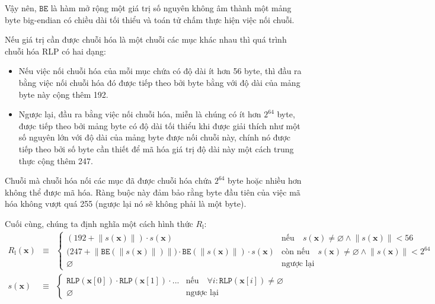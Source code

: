\documentclass[9pt,oneside]{amsart}
\makeatletter
\newcommand{\linkdest}[1]{\Hy@raisedlink{\hypertarget{#1}{}}}
\makeatother
\begin{document}
Vậy nên, $\mathtt{BE}$ là hàm mở rộng một giá trị số nguyên không âm thành một mảng byte big-endian có chiều dài tối thiểu và toán tử chấm thực hiện việc nối chuỗi.

\hypertarget{RLP_serialisation_of_a_sequence_of_other_items_R__l_word_def}{}\linkdest{R__l}Nếu giá trị cần được chuỗi hóa là một chuỗi các mục khác nhau thì quá trình chuỗi hóa RLP có hai dạng:

\begin{itemize}
\item Nếu việc nối chuỗi hóa của mỗi mục chứa có độ dài ít hơn 56 byte, thì đầu ra bằng việc nối chuỗi hóa đó được tiếp theo bởi byte bằng với độ dài của mảng byte này cộng thêm 192.
\item Ngược lại, đầu ra bằng việc nối chuỗi hóa, miễn là chúng có ít hơn $2^{64}$ byte, được tiếp theo bởi mảng byte có độ dài tối thiểu khi được giải thích như một số nguyên lớn với độ dài của mảng byte được nối chuỗi này, chính nó được tiếp theo bởi số byte cần thiết để mã hóa giá trị độ dài này một cách trung thực cộng thêm 247.
\end{itemize}

Chuỗi mà chuỗi hóa nối các mục đã được chuỗi hóa chứa $2^{64}$ byte hoặc nhiều hơn không thể được mã hóa. Ràng buộc này đảm bảo rằng byte đầu tiên của việc mã hóa không vượt quá 255 (ngược lại nó sẽ không phải là một byte).

\hypertarget{RLP_serialisation_of_a_sequence_of_other_items_R__l_math_def}{}Cuối cùng, chúng ta định nghĩa một cách hình thức $R_{\mathrm{l}}$:
\begin{eqnarray}
R_{\mathrm{l}}(\mathbf{x}) & \equiv & \begin{cases}
(192 + \lVert s(\mathbf{x}) \rVert) \cdot s(\mathbf{x}) & \text{nếu} \quad s(\mathbf{x}) \neq \varnothing \wedge \lVert s(\mathbf{x}) \rVert < 56 \\
\big(247 + \big\lVert \mathtt{BE}(\lVert s(\mathbf{x}) \rVert) \big\rVert \big) \cdot \mathtt{BE}(\lVert s(\mathbf{x}) \rVert) \cdot s(\mathbf{x}) & \text{còn nếu} \quad s(\mathbf{x}) \neq \varnothing \wedge \lVert s(\mathbf{x}) \rVert < 2^{64} \\
\varnothing & \text{ngược lại}
\end{cases} \\
s(\mathbf{x}) & \equiv & \begin{cases}
\mathtt{RLP}(\mathbf{x}[0]) \cdot \mathtt{RLP}(\mathbf{x}[1]) \cdot ... & \text{nếu} \quad \forall i: \mathtt{RLP}(\mathbf{x}[i]) \neq \varnothing \\
\varnothing & \text{ngược lại}
\end{cases}
\end{eqnarray}
\end{document}
